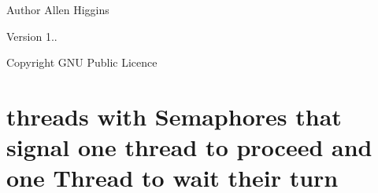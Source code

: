\begin{DoxyAuthor}{Author}
Allen Higgins 
\end{DoxyAuthor}
\begin{DoxyVersion}{Version}
1.. 
\end{DoxyVersion}
\begin{DoxyCopyright}{Copyright}
G\+NU Public Licence
\end{DoxyCopyright}
\hypertarget{index_Two}{}\section{threads with Semaphores that signal one thread to proceed and one Thread to wait their turn}\label{index_Two}
